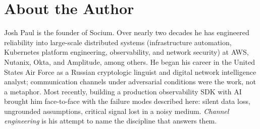 \documentclass[11pt, a4paper]{article}
\begin{document}
\normalsize
{}\relax
\newpage
\section*{About the Author}

\noindent Josh Paul is the founder of Socium. Over nearly two decades he has engineered
reliability into large-scale distributed systems (infrastructure automation, Kubernetes
platform engineering, observability, and network security) at AWS, Nutanix, Okta, and
Amplitude, among others. He began his career in the United States Air
Force as a Russian cryptologic linguist and digital network intelligence
analyst; communication channels under adversarial conditions were the work,
not a metaphor. Most recently, building a production observability SDK with AI brought him
face-to-face with the failure modes described here: silent data loss, ungrounded
assumptions, critical signal lost in a noisy medium. \emph{Channel engineering} is his
attempt to name the discipline that answers them.
\end{document}
